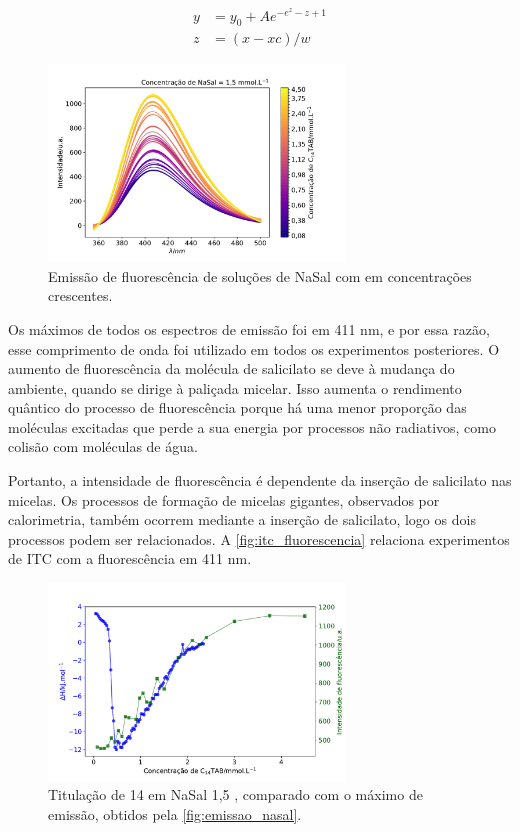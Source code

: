 	\begin{subequations}
		\begin{align}
		y &= y_0 + A e^{-e^{z} - z + 1} \\
		z &= \left( x - xc \right)/w 
		\end{align}
		\label{eqn:ajuste_extremo}
	\end{subequations}
	
	\begin{figure}[h]
		\centering
		\includegraphics[width=0.7\textwidth]{imagens/fluor/emissao_nasal}
		\caption{Emissão de fluorescência de soluções de NaSal com \TTAB{} em concentrações crescentes.}
		\label{fig:emissao_nasal}
	\end{figure}
	
	Os máximos de todos os espectros de emissão foi em 411 nm, e por essa razão, esse comprimento de onda foi utilizado em todos os experimentos posteriores. O aumento de fluorescência da molécula de salicilato se deve à mudança do ambiente, quando se dirige à paliçada micelar. Isso aumenta o rendimento quântico do processo de fluorescência porque há uma menor proporção das moléculas excitadas que perde a sua energia por processos não radiativos, como colisão com moléculas de água.
	
	Portanto, a intensidade de fluorescência é dependente da inserção de salicilato nas micelas. Os processos de formação de micelas gigantes, observados por calorimetria, também ocorrem mediante a inserção de salicilato, logo os dois processos podem ser relacionados. A \autoref{fig:itc_fluorescencia} relaciona experimentos de ITC com a fluorescência em 411 nm.
	
	\begin{figure}[h]
		\centering
		\includegraphics[width=0.7\textwidth]{imagens/fluor/itc_fluorescencia}
		\caption{Titulação de \TTAB{} 14 \mM{} em NaSal 1,5 \mM, comparado com o máximo de emissão, obtidos pela \autoref{fig:emissao_nasal}.}
		\label{fig:itc_fluorescencia}
	\end{figure}
	
